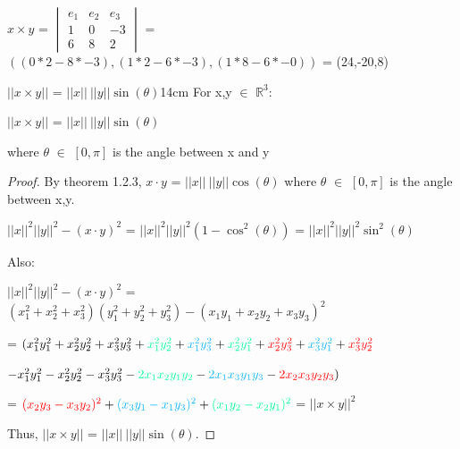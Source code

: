     \begin{tbox}
        $x \times y$
        = $\begin{vmatrix}
            e_1 & e_2 & e_3 \\
            1 & 0 & -3 \\
            6 & 8 & 2 
        \end{vmatrix}$
        = $((0*2 - 8*-3),(1*2 - 6*-3),(1*8 - 6*-0))$
        = (24,-20,8)
    \end{tbox}

    \vspace{0.5cm}



    \begin{wtheorem}{$||x \times y||$ = $||x|| \ ||y|| \sin(\theta)$}{14cm}
        For x,y $\in$ $\mathbb{R}^3$:
        
        \hspace{0.5cm}
        $||x \times y||$ = $||x|| \ ||y|| \sin(\theta)$

        where $\theta$ $\in$ $[0,\pi]$ is the angle between x and y
    \end{wtheorem}

    \begin{proof}
        By {\color{red} theorem 1.2.3},
        $x \cdot y$ = $||x|| \ ||y|| \cos(\theta)$
        where $\theta$ $\in$ $[0,\pi]$ is the angle between x,y.

        \hspace{0.5cm}
        $||x||^2 ||y||^2 - (x \cdot y)^2$
        = $||x||^2 ||y||^2 (1 - \cos^2(\theta))$
        = $||x||^2 ||y||^2 \sin^2(\theta)$

        Also:

        \hspace{0.5cm}
        $||x||^2 ||y||^2 - (x \cdot y)^2$
        = $(x_1^2 + x_2^2 + x_3^2)(y_1^2 + y_2^2 + y_3^2)
            - (x_1y_1 + x_2y_2 + x_3y_3)^2$

        \hspace{0.5cm}
        = $(x_1^2y_1^2 + x_2^2y_2^2 + x_3^2y_3^2
            + {\color{green} x_1^2y_2^2} + {\color{lblue} x_1^2y_3^2}
            + {\color{green} x_2^2y_1^2} + {\color{red} x_2^2y_3^2}
            + {\color{lblue} x_3^2y_1^2} + {\color{red} x_3^2y_2^2}$

            \hspace{1cm}
            $- x_1^2y_1^2 - x_2^2y_2^2 - x_3^2y_3^2
            - {\color{green} 2x_1x_2y_1y_2}
            - {\color{lblue} 2x_1x_3y_1y_3}
            - {\color{red} 2x_2x_3y_2y_3})$

        \hspace{0.5cm}
        = ${\color{red} (x_2y_3 - x_3y_2)^2}
            + {\color{lblue} (x_3y_1 - x_1y_3)^2}
            + {\color{green} (x_1y_2 - x_2y_1)^2}$
        = $||x \times y||^2$

        Thus, $||x \times y||$ = $||x|| \ ||y|| \sin(\theta)$.
    \end{proof}

